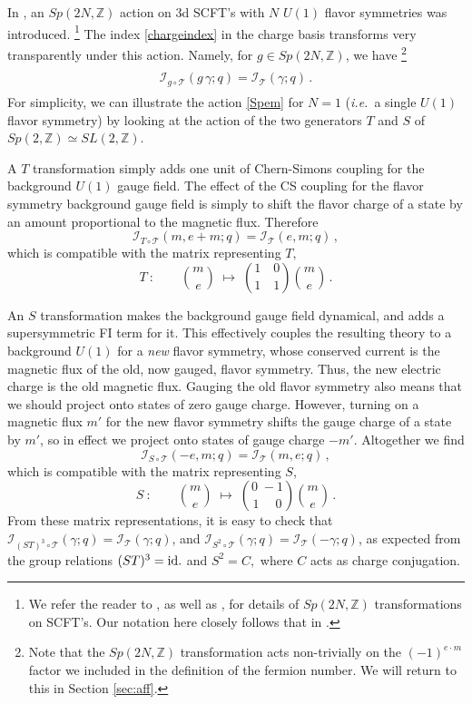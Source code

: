 \documentclass[11pt,letterpaper]{article}
\numberwithin{equation}{section}
\newcommand{\be}{\begin{equation}}
\newcommand{\ee}{\end{equation}}
\newcommand{\ie}{\emph{i.e.}}
\newcommand{\Z}{{\mathbb Z}}
\newcommand{\CI}{\mathcal{I}}
\newcommand{\CT}{\mathcal{T}}
\newcommand{\q}{q}
\begin{document}
In \cite{Witten-SL2}, an $Sp(2N,\Z)$ action on 3d SCFT's with $N$ $U(1)$ flavor symmetries was introduced.%
%
\footnote{We refer the reader to \cite{Witten-SL2}, as well as \cite{DGG}, for details of $Sp(2N,\Z)$ transformations on SCFT's. Our notation here closely follows that in \cite{DGG}.} %
%
The index \eqref{chargeindex} in the charge basis transforms very transparently under this action. Namely, for $g\in Sp(2N,\Z)$, we have%
%
\footnote{Note that the $Sp(2N,\Z)$ transformation acts non-trivially on the $(-1)^{e \cdot m}$ factor we included in the definition of the fermion number. We will return to this in Section \ref{sec:aff}.} %
%
%
\be \label{Spem}
\boxed{\phantom{\int}\CI_{g\circ \CT}(g\,\gamma;q) = \CI_\CT(\gamma;q)\,.\phantom{\int}}
\ee
%
For simplicity, we can illustrate the action \eqref{Spem} for $N=1$ (\ie\ a single $U(1)$ flavor symmetry) by looking at the action of the two generators $T$ and $S$ of $Sp(2,\Z)\simeq SL(2,\Z)$.


A $T$ transformation simply adds one unit of Chern-Simons coupling for the background $U(1)$ gauge field.
The effect of the CS coupling for the flavor symmetry background gauge field
is simply to shift the flavor charge of a state by an amount proportional to the magnetic flux.
Therefore
%
\be \label{Tsim}
\CI_{T\circ \CT}(m,e+m;q) = \CI_\CT(e,m;q)\,,
\ee
%
which is compatible with the matrix representing $T$,
\be
T ~: \qquad
{m \choose e} \; \mapsto \;
{1 \quad 0 \choose 1 \quad 1} {m \choose e}\,.
\ee


An $S$ transformation makes the background gauge field dynamical, and adds a supersymmetric FI term for it. This effectively couples the resulting theory to a background $U(1)$ for a \emph{new} flavor symmetry,
whose conserved current is the magnetic flux of the old, now gauged, flavor symmetry. Thus, the new electric charge is the old magnetic flux. Gauging the old flavor symmetry also means that we should project onto states of zero gauge charge. However, turning on a magnetic flux $m'$ for the new flavor symmetry shifts the gauge charge of a state by $m'$, so in effect we project onto states of gauge charge $-m'$. Altogether we find
%
\be \label{Ssim}
\CI_{S \circ \CT}(-e,m;\q) = \CI_\CT(m,e;\q)\,,
\ee
%
which is compatible with the matrix representing $S$,
%
\be
S ~: \qquad
{m \choose e} \; \mapsto \;
{0 \; -1 \choose 1\; \quad 0}  {m \choose e}\,.
\ee
%
From these matrix representations, it is easy to check that $\CI_{(ST)^3\circ \CT}(\gamma;q) = \CI_\CT(\gamma;q)$, and $\CI_{S^2\circ\CT}(\gamma;q)=\CI_{\CT}(-\gamma;q)$, as expected from the group relations $(ST)^3=\rm{id.}$ and $S^2 = C,$ where $C$ acts as charge conjugation.
\end{document}
